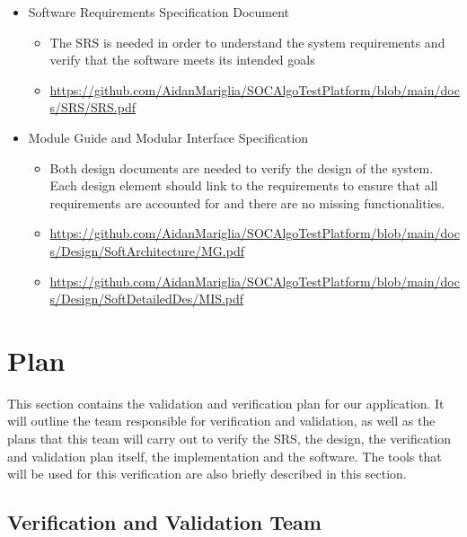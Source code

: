 \documentclass[12pt, titlepage]{article}
\begin{document}
\begin{itemize}
    \item Software Requirements Specification Document 
    \begin{itemize}
        \item The SRS is needed in order to understand the system requirements and verify that the software meets its intended goals
        \item \url{https://github.com/AidanMariglia/SOCAlgoTestPlatform/blob/main/docs/SRS/SRS.pdf}
    \end{itemize}
    \item Module Guide and Modular Interface Specification
    \begin{itemize}
        \item Both design documents are needed to verify the design of the system. Each design element should link to the requirements to ensure that all requirements are accounted for and there are no missing functionalities.
        \item \url{https://github.com/AidanMariglia/SOCAlgoTestPlatform/blob/main/docs/Design/SoftArchitecture/MG.pdf}
        \item \url{https://github.com/AidanMariglia/SOCAlgoTestPlatform/blob/main/docs/Design/SoftDetailedDes/MIS.pdf}
    \end{itemize}
\end{itemize}

\section{Plan}

This section contains the validation and verification plan for our application. It will outline the team responsible for verification and validation, as well as the plans that this team will carry out to verify the SRS, the design, the verification and validation plan itself, the implementation and the software. The tools that will be used for this verification are also briefly described in this section.

\subsection{Verification and Validation Team}
\end{document}
